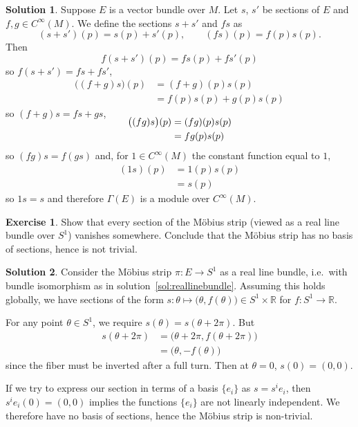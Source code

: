 \documentclass[11pt, a4paper]{report}
\theoremstyle{definition}
\newtheorem{exercise}{Exercise}[part]
\newtheorem{solution}{Solution}[part]
\newenvironment{ex}{\begin{exercise}}{\end{exercise}\pagebreak[1]}
\newenvironment{sol}{\begin{solution}}{\end{solution}\pagebreak[3]}
\begin{document}
\begin{sol}

Suppose $E$ is a vector bundle over $M$. Let $s$, $s'$ be sections of $E$ and $f,g \in C^\infty(M)$.
We define the sections $s + s'$ and $fs$ as
\[
    (s + s')(p) = s(p) + s'(p), \qquad
    (fs)(p) = f(p) s(p).
\]
Then
\[
    f(s + s')(p) = fs(p) + fs'(p)
\]
so $f(s + s') = fs + fs'$,
\begin{align*}
    \bigl((f + g)s\bigr)(p) &= (f + g)(p) s(p) \\
                            &= f(p) s(p) + g(p) s(p)
\end{align*}
so $(f + g)s = fs + gs$,
\begin{align*}
    \SwapAboveDisplaySkip
    \bigl((fg) s\bigr) (p) &= (fg)(p) s(p) \\
                           &= fg(p) s(p)
\end{align*}
so $(fg)s = f(gs)$ and, for $1 \in C^\infty(M)$ the constant function equal to $1$,
\begin{align*}
    (1s)(p) &= 1(p) s(p) \\
            &= s(p)
\end{align*}
so $1s = s$ and therefore $\Gamma(E)$ is a module over $C^\infty(M)$.

\end{sol}

\begin{ex}

Show that every section of the Möbius strip (viewed as a real line bundle over $S^1$) vanishes somewhere.
Conclude that the Möbius strip has no basis of sections, hence is not trivial.

\end{ex}

\begin{sol}

Consider the Möbius strip $\pi: E \to S^1$ as a real line bundle, i.e.\ with bundle isomorphism as in solution~\ref{sol:reallinebundle}.
Assuming this holds globally, we have sections of the form $s: \theta \mapsto \bigl(\theta, f(\theta) \bigr) \in S^1 \times \mathbb{R}$ for $f: S^1 \to \mathbb{R}$.

For any point $\theta \in S^1$, we require $s(\theta) = s(\theta + 2 \pi)$. But
\begin{align*}
    s(\theta + 2 \pi) &= \bigl(\theta + 2 \pi, f(\theta + 2 \pi) \bigr) \\
                      &= \bigl(\theta, -f(\theta) \bigr)
\end{align*}
since the fiber must be inverted after a full turn. Then at $\theta = 0$, $s(0) = (0, 0)$.

If we try to express our section in terms of a basis $\{e_i\}$ as $s = s^i e_i$, then $s^i e_i (0) = (0, 0)$ implies the functions $\{e_i\}$ are not linearly independent.
We therefore have no basis of sections, hence the Möbius strip is non-trivial.

\end{sol}
\end{document}
